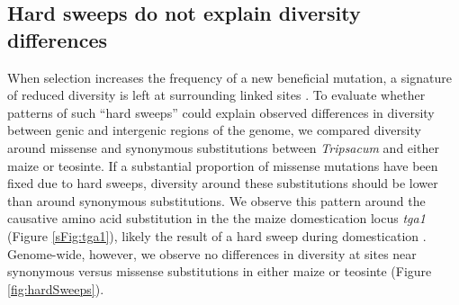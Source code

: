 \documentclass{pnastwo}
\newcommand{\mbh}[1]{\textcolor{blue}{\scriptsize #1}}
\begin{document}
\begin{article}
\subsection{Hard sweeps do not explain diversity differences} %
When selection increases the frequency of a new beneficial mutation, a signature of reduced diversity is left at surrounding linked sites \cite{smith1974}.
To evaluate whether patterns of such ``hard sweeps'' could explain observed differences in diversity between genic and intergenic regions of the genome, we compared diversity around missense and synonymous substitutions between \emph{Tripsacum} and either maize or teosinte.
If a substantial proportion of missense mutations have been fixed due to hard sweeps, diversity around these substitutions should be lower than around synonymous substitutions. 
We observe this pattern around the causative amino acid substitution in the the maize domestication locus \emph{tga1} (Figure \ref{sFig:tga1}), likely the result of a hard sweep during domestication \cite{wang2005, wang2015}. Genome-wide, however, we observe no differences in diversity at sites near synonymous versus missense substitutions in either maize or teosinte (Figure \ref{fig:hardSweeps}).



\end{article}
\end{document}
